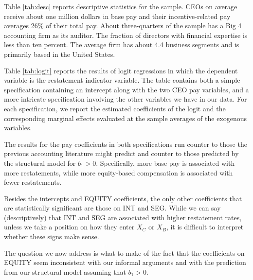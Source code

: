 Table \ref{tab:desc} reports descriptive statistics for the sample. 
CEOs on average receive about one million dollars in base pay and their incentive-related pay averages 26\% of their total pay.
About three-quarters of the sample has a Big 4 accounting firm as its auditor. 
The fraction of directors with financial expertise is less than ten percent. 
The average firm has about 4.4 business segments and is primarily based in the United States.

Table \ref{tab:logit} reports the results of logit regressions in which the dependent variable is the restatement indicator variable. 
The table contains both a simple specification containing an intercept along with the two CEO pay variables, and a more intricate specification involving the other variables we have in our data.
For each specification, we report the estimated coefficients of the logit and the corresponding marginal effects evaluated at the sample averages of the exogenous variables.

The results for the pay coefficients in both specifications run counter to those the previous accounting literature might predict and counter to those predicted by the structural model for $b_1 > 0$.
Specifically, more base pay is associated with more restatements, while more equity-based compensation is associated with fewer restatements.

Besides the intercepts and EQUITY coefficients, the only other coefficients that are statistically significant are those on INT and SEG.
While we can say (descriptively) that INT and SEG are associated with higher restatement rates, unless we take a position on how they enter $X_C$ or $X_B$, it is difficult to interpret whether these signs make sense.

The question we now address is what to make of the fact that the coefficients on EQUITY seem inconsistent with our informal arguments and with the prediction from our structural model assuming that $b_1>0$.


